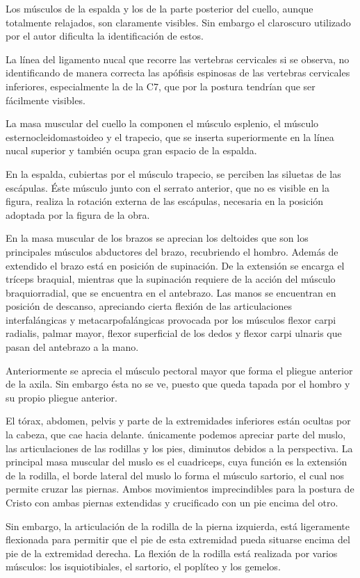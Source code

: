 Los músculos de la espalda y los de la parte posterior del cuello, aunque totalmente relajados, son claramente visibles. Sin embargo el claroscuro utilizado por el autor dificulta la identificación de estos.

La línea del ligamento nucal que recorre las vertebras cervicales si se observa, no identificando de manera correcta las apófisis espinosas de las vertebras cervicales inferiores, especialmente la de la C7, que por la postura tendrían que ser fácilmente visibles. 

La masa muscular del cuello la componen el músculo esplenio, el músculo esternocleidomastoideo y el trapecio, que se inserta superiormente en la línea nucal superior y también ocupa gran espacio de la espalda.

En la espalda, cubiertas por el músculo trapecio, se perciben las siluetas de las escápulas. Éste músculo junto con  el serrato anterior, que no es visible en la figura, realiza la rotación externa de las escápulas, necesaria en la posición adoptada por la figura de la obra.

En la masa muscular de los brazos se aprecian los deltoides que son los principales músculos abductores del brazo, recubriendo el hombro. Además de extendido el brazo está en posición de supinación. De la extensión se encarga el tríceps braquial, mientras que la supinación requiere de la acción del músculo braquiorradial, que se encuentra en el antebrazo. Las manos se encuentran en posición de descanso, apreciando cierta flexión de las articulaciones interfalángicas y metacarpofalángicas provocada por los músculos flexor carpi radialis, palmar mayor, flexor superficial de los dedos y flexor carpi ulnaris que pasan del antebrazo a la mano.

Anteriormente se aprecia el músculo pectoral mayor que forma el pliegue anterior de la axila. Sin embargo ésta no se ve, puesto que queda tapada por el hombro y su propio pliegue anterior.

El tórax, abdomen, pelvis y parte de la extremidades inferiores están ocultas por la cabeza, que cae hacia delante. únicamente podemos apreciar parte del muslo, las articulaciones de las rodillas y los pies, diminutos debidos a la perspectiva. La principal masa muscular del muslo es el cuadriceps, cuya función es la extensión de la rodilla, el borde lateral del muslo lo forma el músculo sartorio, el cual nos permite cruzar las piernas. Ambos movimientos imprecindibles para la postura de Cristo con ambas piernas extendidas y crucificado con un pie encima del otro.

Sin embargo, la articulación de la rodilla de la pierna izquierda, está ligeramente flexionada para permitir que el pie de esta extremidad pueda situarse encima del pie de la extremidad derecha. La flexión de la rodilla está realizada por varios músculos: los isquiotibiales, el sartorio, el poplíteo y los gemelos.
